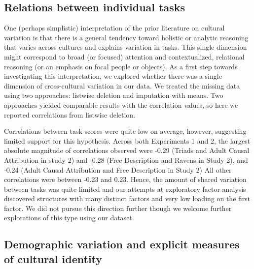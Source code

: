 \documentclass[
  man]{apa6}
\begin{document}
\hypertarget{relations-between-individual-tasks}{%
\subsection{Relations between individual tasks}\label{relations-between-individual-tasks}}

One (perhaps simplistic) interpretation of the prior literature on cultural variation is that there is a general tendency toward holistic or analytic reasoning that varies across cultures and explains variation in tasks. This single dimension might correspond to broad (or focused) attention and contextualized, relational reasoning (or an emphasis on focal people or objects). As a first step towards investigating this interpretation, we explored whether there was a single dimension of cross-cultural variation in our data. We treated the missing data using two approaches: listwise deletion and imputation with means. Two approaches yielded comparable results with the correlation values, so here we reported correlations from listwise deletion.

Correlations between task scores were quite low on average, however, suggesting limited support for this hypothesis. Across both Experiments 1 and 2, the largest absolute magnitude of correlations observed were -0.29 (Triads and Adult Causal Attribution in study 2) and -0.28 (Free Description and Ravens in Study 2), and -0.24 (Adult Causal Attribution and Free Description in Study 2) All other correlations were between -0.23 and 0.23. Hence, the amount of shared variation between tasks was quite limited and our attempts at exploratory factor analysis discovered structures with many distinct factors and very low loading on the first factor. We did not pursue this direction further though we welcome further explorations of this type using our dataset.

\hypertarget{demographic-variation-and-explicit-measures-of-cultural-identity}{%
\subsection{Demographic variation and explicit measures of cultural identity}\label{demographic-variation-and-explicit-measures-of-cultural-identity}}
\end{document}
